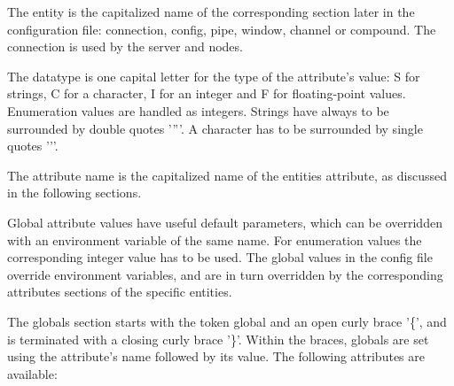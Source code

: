 \documentclass[10pt,a4]{scrartcl}
\begin{document}
The entity is the capitalized name of the corresponding section later in
the configuration file: connection, config, pipe, window, channel or
compound. The connection is used by the server and nodes.

The datatype is one capital letter for the type of the attribute's
value: \textsf{S} for strings, \textsf{C} for a character, \textsf{I}
for an integer and \textsf{F} for floating-point values. Enumeration
values are handled as integers. Strings have always to be surrounded by
double quotes '\textsf{''}'. A character has to be surrounded by single
quotes '\textsf{'}'.

The attribute name is the capitalized name of the entities attribute, as
discussed in the following sections.

Global attribute values have useful default parameters, which can be
overridden with an environment variable of the same name. For enumeration
values the corresponding integer value has to be used. The global values
in the config file override environment variables, and are in turn
overridden by the corresponding attributes sections of the specific
entities.

The globals section starts with the token \textsf{global} and an open
curly brace '\textsf{\{}', and is terminated with a closing curly brace
'\textsf{\}}'. Within the braces, globals are set using the attribute's
name followed by its value. The following attributes are available:
\end{document}
